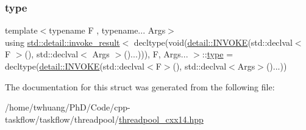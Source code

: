 \subsubsection{\texorpdfstring{type}{type}}
{\footnotesize\ttfamily template$<$typename F , typename... Args$>$ \\
using \hyperlink{structstd_1_1detail_1_1invoke__result}{std\+::detail\+::invoke\+\_\+result}$<$ decltype(void(\hyperlink{namespacestd_1_1detail_ac5263dda7d727dde5281b6b1da8ebb79}{detail\+::\+I\+N\+V\+O\+KE}(std\+::declval$<$ F $>$(), std\+::declval$<$ Args $>$()...))), F, Args... $>$\+::\hyperlink{structstd_1_1detail_1_1invoke__result_3_01decltype_07void_07detail_1_1INVOKE_07std_1_1declval_3_86a9900dcd4a84f000244f479e0f71a8_a23231eda2a8247ba660dd6c3146fe3ed}{type} =  decltype(\hyperlink{namespacestd_1_1detail_ac5263dda7d727dde5281b6b1da8ebb79}{detail\+::\+I\+N\+V\+O\+KE}(std\+::declval$<$F$>$(), std\+::declval$<$Args$>$()...))}



The documentation for this struct was generated from the following file\+:\begin{DoxyCompactItemize}
\item 
/home/twhuang/\+Ph\+D/\+Code/cpp-\/taskflow/taskflow/threadpool/\hyperlink{threadpool__cxx14_8hpp}{threadpool\+\_\+cxx14.\+hpp}\end{DoxyCompactItemize}
